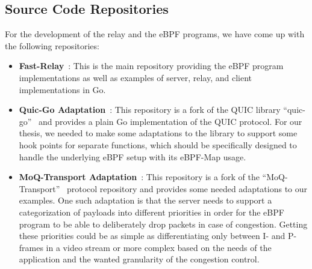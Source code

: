 \subsection{Source Code Repositories}\label{sec:source_code_repos}
For the development of the relay and the eBPF programs, we have come up with the following repositories:
\begin{itemize}

    \item \textbf{Fast-Relay}~\parencite{adaptive-moq-repo}:
    This is the main repository providing the eBPF program implementations as well as examples of 
    server, relay, and client implementations in Go.
    
    \item \textbf{Quic-Go Adaptation}~\parencite{quic-go-prio-packs-repo}:
    This repository is a fork of the QUIC library ``quic-go''~\parencite{quic-go-repo} and provides a 
    plain Go implementation of the QUIC protocol.
    For our thesis, we needed to make some adaptations to the library to support some hook points for 
    separate functions, which should be specifically designed to handle the underlying eBPF setup with its eBPF-Map usage. 
    
    \item \textbf{MoQ-Transport Adaptation}~\parencite{priority-moqtransport-repo}:
    This repository is a fork of the ``MoQ-Transport''~\parencite{draft-moqtransport} protocol repository and provides
    some needed adaptations to our examples. One such adaptation is that the server needs to support a 
    categorization of payloads into different priorities in order for the eBPF program to be able to 
    deliberately drop packets in case of congestion.
    Getting these priorities could be as simple as differentiating only between I- and P-frames in a video 
    stream or more complex based on the needs of the application and the wanted granularity of the congestion 
    control.
    
\end{itemize}